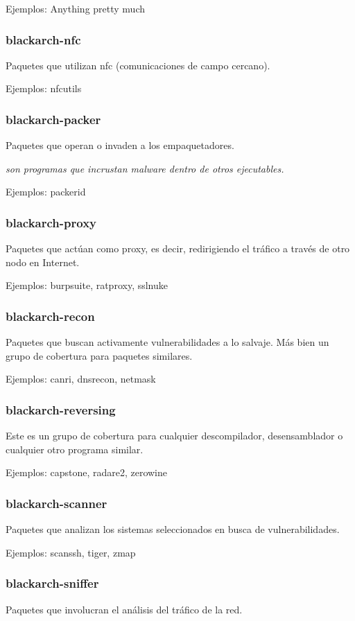 \documentclass[a4paper, oneside, 11pt]{book}
\begin{document}
Ejemplos: Anything pretty much

\subsubsection{blackarch-nfc}
Paquetes que utilizan nfc (comunicaciones de campo cercano).

Ejemplos: nfcutils

\subsubsection{blackarch-packer}
Paquetes que operan o invaden a los empaquetadores.

\textit{son programas que incrustan malware dentro de otros ejecutables.}

Ejemplos: packerid

\subsubsection{blackarch-proxy}
Paquetes que act\'uan como proxy, es decir, redirigiendo el tr\'afico
a trav\'es de otro nodo en Internet.

Ejemplos: burpsuite, ratproxy, sslnuke

\subsubsection{blackarch-recon}
Paquetes que buscan activamente vulnerabilidades a
lo salvaje. M\'as bien un grupo de cobertura para paquetes similares.

Ejemplos: canri, dnsrecon, netmask

\subsubsection{blackarch-reversing}
Este es un grupo de cobertura para cualquier descompilador,
desensamblador o cualquier otro programa similar.

Ejemplos: capstone, radare2, zerowine

\subsubsection{blackarch-scanner}
Paquetes que analizan los sistemas seleccionados en busca de vulnerabilidades.

Ejemplos: scanssh, tiger, zmap

\subsubsection{blackarch-sniffer}
Paquetes que involucran el an\'alisis del tr\'afico de la red.
\end{document}
